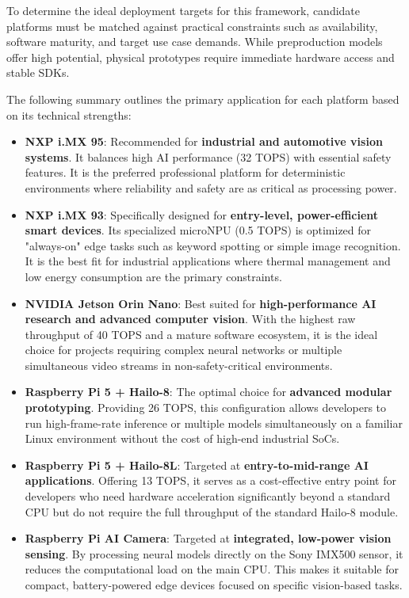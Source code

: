 To determine the ideal deployment targets for this framework, candidate platforms must be matched against practical constraints such as availability, software maturity, and target use case demands. While preproduction models offer high potential, physical prototypes require immediate hardware access and stable \glspl{SDK}. 

The following summary outlines the primary application for each platform based on its technical strengths:

\begin{itemize}
    \item \textbf{NXP i.MX 95}: Recommended for \textbf{industrial and automotive vision systems}. It balances high \gls{AI} performance (32 \gls{TOPS}) with essential safety features. It is the preferred professional platform for deterministic environments where reliability and safety are as critical as processing power.
    
    \item \textbf{NXP i.MX 93}: Specifically designed for \textbf{entry-level, power-efficient smart devices}. Its specialized micro\gls{NPU} (0.5 \gls{TOPS}) is optimized for "always-on" edge tasks such as keyword spotting or simple image recognition. It is the best fit for industrial applications where thermal management and low energy consumption are the primary constraints.
    
    \item \textbf{NVIDIA Jetson Orin Nano}: Best suited for \textbf{high-performance \gls{AI} research and advanced computer vision}. With the highest raw throughput of 40 \gls{TOPS} and a mature software ecosystem, it is the ideal choice for projects requiring complex neural networks or multiple simultaneous video streams in non-safety-critical environments.

    \item \textbf{Raspberry Pi 5 + Hailo-8}: The optimal choice for \textbf{advanced modular prototyping}. Providing 26 \gls{TOPS}, this configuration allows developers to run high-frame-rate inference or multiple models simultaneously on a familiar Linux environment without the cost of high-end industrial \glspl{SoC}.

    \item \textbf{Raspberry Pi 5 + Hailo-8L}: Targeted at \textbf{entry-to-mid-range \gls{AI} applications}. Offering 13 \gls{TOPS}, it serves as a cost-effective entry point for developers who need hardware acceleration significantly beyond a standard \gls{CPU} but do not require the full throughput of the standard Hailo-8 module.

    \item \textbf{Raspberry Pi \gls{AI} Camera}: Targeted at \textbf{integrated, low-power vision sensing}. By processing neural models directly on the Sony IMX500 sensor, it reduces the computational load on the main \gls{CPU}. This makes it suitable for compact, battery-powered edge devices focused on specific vision-based tasks.
\end{itemize}

